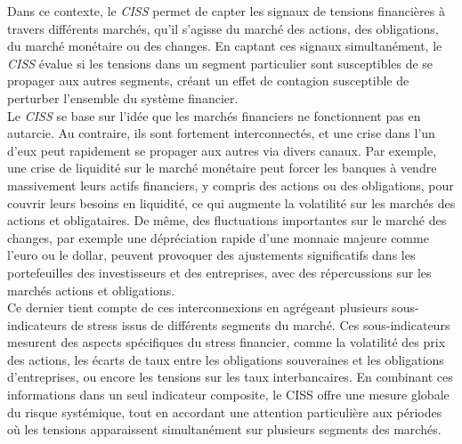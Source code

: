 \begin{sloppypar}
Dans ce contexte, le \textit{CISS} permet de capter les signaux de tensions financières à travers différents marchés, qu'il s'agisse du marché des actions, des obligations, du marché monétaire ou des changes. En captant ces signaux simultanément, le \textit{CISS} évalue si les tensions dans un segment particulier sont susceptibles de se propager aux autres segments, créant un effet de contagion susceptible de perturber l’ensemble du système financier.\\

Le \textit{CISS} se base sur l'idée que les marchés financiers ne fonctionnent pas en autarcie. Au contraire, ils sont fortement interconnectés, et une crise dans l'un d'eux peut rapidement se propager aux autres via divers canaux. Par exemple, une crise de liquidité sur le marché monétaire peut forcer les banques à vendre massivement leurs actifs financiers, y compris des actions ou des obligations, pour couvrir leurs besoins en liquidité, ce qui augmente la volatilité sur les marchés des actions et obligataires. De même, des fluctuations importantes sur le marché des changes, par exemple une dépréciation rapide d'une monnaie majeure comme l'euro ou le dollar, peuvent provoquer des ajustements significatifs dans les portefeuilles des investisseurs et des entreprises, avec des répercussions sur les marchés actions et obligations. \\

Ce dernier tient compte de ces interconnexions en agrégeant plusieurs sous-indicateurs de stress issus de différents segments du marché. Ces sous-indicateurs mesurent des aspects spécifiques du stress financier, comme la volatilité des prix des actions, les écarts de taux entre les obligations souveraines et les obligations d'entreprises, ou encore les tensions sur les taux interbancaires. En combinant ces informations dans un seul indicateur composite, le CISS offre une mesure globale du risque systémique, tout en accordant une attention particulière aux périodes où les tensions apparaissent simultanément sur plusieurs segments des marchés.\\


\end{sloppypar}
